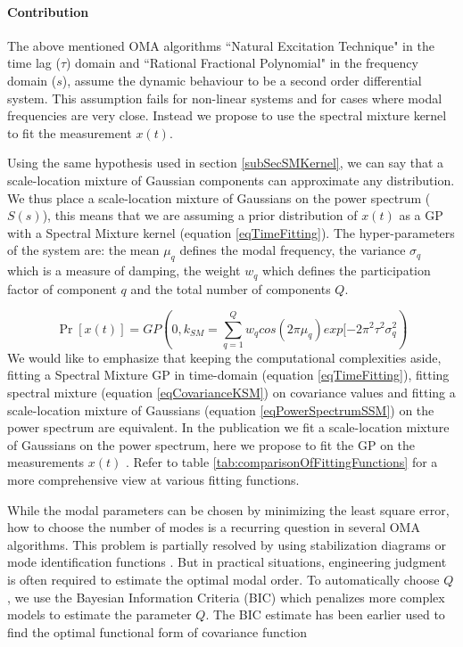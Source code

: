 \begin{mdframed}[hidealllines=true,backgroundcolor=blue!20]
\paragraph{Contribution}
The above mentioned OMA algorithms ``Natural Excitation Technique" in the time lag ($ \tau$) domain and ``Rational Fractional Polynomial" in the frequency domain ($s$), assume the dynamic behaviour to be a second order differential system. This assumption fails for non-linear systems and for cases where modal frequencies are very close. Instead we propose to use the spectral mixture kernel to fit the measurement $x(t)$. 

Using the same hypothesis used in section \ref{subSecSMKernel}, we can say that a scale-location mixture of Gaussian components can approximate any distribution. We thus place a scale-location mixture of Gaussians on the power spectrum ($S(s)$), this means that we are assuming a prior distribution of $x(t)$ as a GP with a Spectral Mixture kernel (equation \ref{eqTimeFitting}). The hyper-parameters of the system are: the mean $\mu_{q}$ defines the modal frequency, the variance $\sigma_{q}$ which is a measure of damping, the weight $w_{q}$ which defines the participation factor of component $q$ and the total number of components $Q$.

\begin{equation}\label{eqTimeFitting}
\Pr[x(t)] = GP(0, k_{SM} = \sum_{q=1}^{Q}w_{q}cos(2\pi\mu_{q}) exp[-2\pi^{2}\tau^{2}\sigma_{q}^2)
\end{equation}
\sloppy We would like to emphasize that keeping the computational complexities aside, fitting a Spectral Mixture GP in time-domain (equation \ref{eqTimeFitting}), fitting spectral mixture (equation \ref{eqCovarianceKSM}) on covariance values and fitting a scale-location mixture of Gaussians (equation \ref{eqPowerSpectrumSSM}) on the power spectrum are equivalent. In the publication \cite{chiplunkar2017operational} we fit a scale-location mixture of Gaussians on the power spectrum, here we propose to fit the GP on the measurements $x(t)$ . Refer to table \ref{tab:comparisonOfFittingFunctions} for a more comprehensive view at various fitting functions.


While the modal parameters can be chosen by minimizing the least square error, how to choose the number of modes is a recurring question in several OMA algorithms. This problem is partially resolved by using stabilization diagrams or mode identification functions \cite{allemang1998unified, williams1985multivariate, shih1988complex}. But in practical situations, engineering judgment is often required to estimate the optimal modal order. To automatically choose $Q$, we use the Bayesian Information Criteria (BIC) \cite{findley1991counterexamples} which penalizes more complex models to estimate the parameter $Q$. The BIC estimate has been earlier used to find the optimal functional form of covariance function \cite{duvenaud2013structure}


\end{mdframed}
